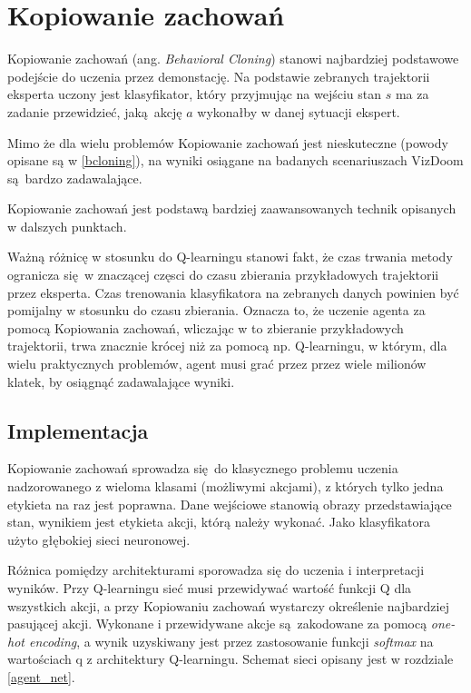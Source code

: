 \section{Kopiowanie zachowań} \label{behavioral_cloning}

Kopiowanie zachowań (ang. \textit{Behavioral Cloning}) stanowi najbardziej podstawowe podejście do uczenia przez demonstację. Na podstawie zebranych trajektorii eksperta uczony jest klasyfikator, który przyjmując na wejściu stan $s$ ma za zadanie przewidzieć, jaką akcję $a$ wykonałby w danej sytuacji ekspert.

Mimo że dla wielu problemów Kopiowanie zachowań jest nieskuteczne (powody opisane są w \ref{bcloning}), na wyniki osiągane na badanych scenariuszach VizDoom są bardzo zadawalające.

Kopiowanie zachowań jest podstawą bardziej zaawansowanych technik opisanych w dalszych punktach.

Ważną różnicę w stosunku do Q-learningu stanowi fakt, że czas trwania metody ogranicza się w znaczącej częsci do czasu zbierania przykładowych trajektorii przez eksperta. Czas trenowania klasyfikatora na zebranych danych powinien być pomijalny w stosunku do czasu zbierania. Oznacza to, że uczenie agenta za pomocą Kopiowania zachowań, wliczając w to zbieranie przykładowych trajektorii, trwa znacznie krócej niż za pomocą np. Q-learningu, w którym, dla wielu praktycznych problemów, agent musi grać przez przez wiele milionów klatek, by osiągnąć zadawalające wyniki. 

\subsection{Implementacja}

Kopiowanie zachowań sprowadza się do klasycznego problemu uczenia nadzorowanego z wieloma klasami (możliwymi akcjami), z których tylko jedna etykieta na raz jest poprawna. Dane wejściowe stanowią obrazy przedstawiające stan, wynikiem jest etykieta akcji, którą należy wykonać. Jako klasyfikatora użyto głębokiej sieci neuronowej.

Różnica pomiędzy architekturami sporowadza się do uczenia i interpretacji wyników. Przy Q-learningu sieć musi przewidywać wartość funkcji Q dla wszystkich akcji, a przy Kopiowaniu zachowań wystarczy określenie najbardziej pasującej akcji. Wykonane i przewidywane akcje są zakodowane za pomocą \textit{one-hot encoding}, a wynik uzyskiwany jest przez zastosowanie funkcji \textit{softmax} na wartościach q z architektury Q-learningu. Schemat sieci opisany jest w rozdziale \ref{agent_net}.


